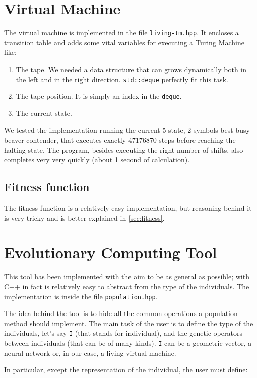 \documentclass{report}
\begin{document}
\section{Virtual Machine}
The virtual machine is implemented in the file \texttt{living-tm.hpp}. It encloses a transition table and adds some vital variables for executing a Turing Machine like:

\begin{enumerate}
\item The tape. We needed a data structure that can grows dynamically both in the left and in the right direction. \texttt{std::deque} perfectly fit this task.
\item The tape position. It is simply an index in the \texttt{deque}.
\item The current state.
\end{enumerate}

We tested the implementation running the current 5 state, 2 symbols best busy beaver contender, that executes exactly 47176870 steps before reaching the halting state. The program, besides executing the right number of shifts, also completes very very quickly (about 1 second of calculation).

\subsection{Fitness function}
The fitness function is a relatively easy implementation, but reasoning behind it is very tricky and is better explained in \ref{sec:fitness}.

\section{Evolutionary Computing Tool}
This tool has been implemented with the aim to be as general as possible; with C++ in fact is relatively easy to abstract from the type of the individuals. The implementation is inside the file \texttt{population.hpp}.

The idea behind the tool is to hide all the common operations a population method should implement. The main task of the user is to define the type of the individuals, let's say \texttt{I} (that stands for individual), and the genetic operators between individuals (that can be of many kinds). \texttt{I} can be a geometric vector, a neural network or, in our case, a living virtual machine.

In particular, except the representation of the individual, the user must define:
\end{document}
